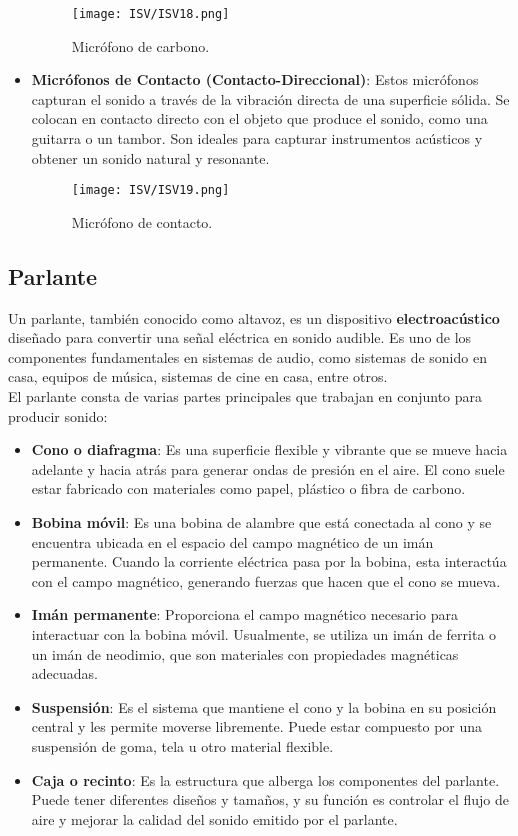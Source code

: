 \documentclass[
	12pt, %
	fleqn, %
	a4paper, %
	oneside, %
]{LegrandOrangeBook}
\begin{document}
\begin{itemize}
\begin{figure}[H]
\centering
\texttt{[image: ISV/ISV18.png]}
\caption{Micrófono de carbono.}
\end{figure}
  \item \textbf{Micrófonos de Contacto (Contacto-Direccional)}: Estos micrófonos capturan el sonido a través de la vibración directa de una superficie sólida. Se colocan en contacto directo con el objeto que produce el sonido, como una guitarra o un tambor. Son ideales para capturar instrumentos acústicos y obtener un sonido natural y resonante.
\begin{figure}[H]
\centering
\texttt{[image: ISV/ISV19.png]}
\caption{Micrófono de contacto.}
\end{figure}
\end{itemize}
\subsection{Parlante}
Un parlante, también conocido como altavoz, es un dispositivo \textbf{electroacústico} diseñado para convertir una señal eléctrica en sonido audible. Es uno de los componentes fundamentales en sistemas de audio, como sistemas de sonido en casa, equipos de música, sistemas de cine en casa, entre otros.\\
El parlante consta de varias partes principales que trabajan en conjunto para producir sonido:

\begin{itemize}
  \item \textbf{Cono o diafragma}: Es una superficie flexible y vibrante que se mueve hacia adelante y hacia atrás para generar ondas de presión en el aire. El cono suele estar fabricado con materiales como papel, plástico o fibra de carbono.

  \item \textbf{Bobina móvil}: Es una bobina de alambre que está conectada al cono y se encuentra ubicada en el espacio del campo magnético de un imán permanente. Cuando la corriente eléctrica pasa por la bobina, esta interactúa con el campo magnético, generando fuerzas que hacen que el cono se mueva.

  \item \textbf{Imán permanente}: Proporciona el campo magnético necesario para interactuar con la bobina móvil. Usualmente, se utiliza un imán de ferrita o un imán de neodimio, que son materiales con propiedades magnéticas adecuadas.

  \item \textbf{Suspensión}: Es el sistema que mantiene el cono y la bobina en su posición central y les permite moverse libremente. Puede estar compuesto por una suspensión de goma, tela u otro material flexible.

  \item \textbf{Caja o recinto}: Es la estructura que alberga los componentes del parlante. Puede tener diferentes diseños y tamaños, y su función es controlar el flujo de aire y mejorar la calidad del sonido emitido por el parlante.

\end{itemize}
\end{document}
